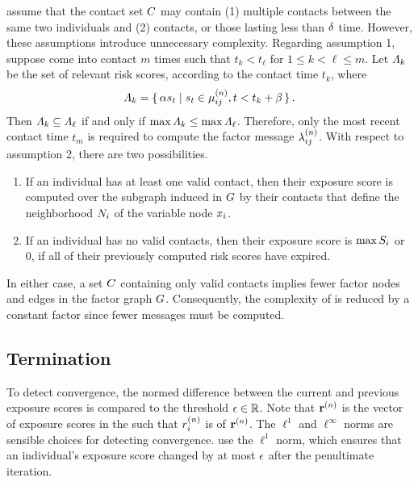 \citet{Ayday2021} assume that the contact set $C$ may contain (1) multiple contacts between the same two individuals and (2)  contacts, or those lasting less than $\delta$ time. However, these assumptions introduce unnecessary complexity. Regarding assumption 1, suppose  come into contact $m$ times such that $t_k < t_\ell$ for $1 \leq k < \ell \leq m$. Let $\varLambda_k$ be the set of relevant risk scores, according to the contact time $t_k$, where
%
\begin{equation*}
  \varLambda_k = \set{ \alpha s_t | s_t \in \mu_{ij}^{(n)}, t < t_k + \beta}.
\end{equation*}
%
Then $\varLambda_k \subseteq \varLambda_\ell$ if and only if $\max \varLambda_k \leq \max \varLambda_\ell$. Therefore, only the most recent contact time $t_m$ is required to compute the factor message $\lambda_{ij}^{(n)}$. With respect to assumption 2, there are two possibilities.
%
\begin{enumerate}
  \item If an individual has at least one valid contact, then their exposure score is computed over the subgraph induced in $G$ by their contacts that define the neighborhood $N_i$ of the variable node $\vVariable_i$.
  \item If an individual has no valid contacts, then their exposure score is $\max S_i$ or $0$, if all of their previously computed risk scores have expired.
\end{enumerate}
%
In either case, a set $C$ containing only valid contacts implies fewer factor nodes and edges in the factor graph $G$. Consequently, the complexity of \cRiskPropagation{} is reduced by a constant factor since fewer messages must be computed.

\subsection{Termination}

To detect convergence, the normed difference between the current and previous exposure scores is compared to the threshold $\epsilon \in \mathbb{R}$. Note that $\mathbf{r}^{(n)}$ is the vector of exposure scores in the  such that $r_{i}^{(n)}$ is  of $\mathbf{r}^{(n)}$. The $\ell^1$ and $\ell^\infty$ norms are sensible choices for detecting convergence. \citet{Ayday2021} use the $\ell^1$ norm, which ensures that an individual's exposure score changed by at most $\epsilon$ after the penultimate iteration.

